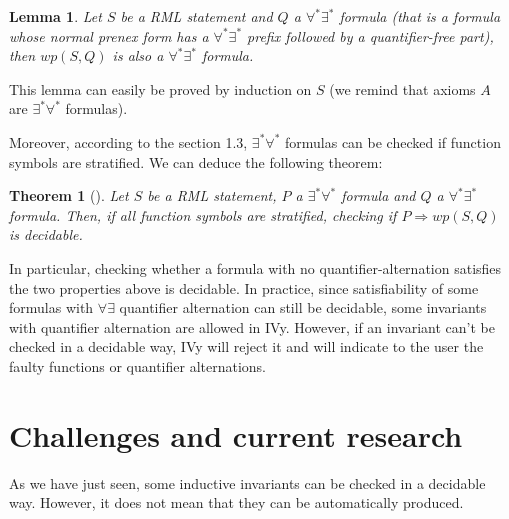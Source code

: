 \documentclass[11pt,a4paper,oldfontcommands,openany]{memoir}
\newtheorem*{theorem}{Theorem}
\newtheorem*{lemma}{Lemma}
\begin{document}
    \begin{lemma}
        Let \(S\) be a RML statement and \(Q\) a \(\forall^*\exists^*\) formula (that is a formula whose normal prenex form has a \(\forall^*\exists^*\) prefix followed by a quantifier-free part), then \(wp(S,Q)\) is also a \(\forall^*\exists^*\) formula.
    \end{lemma}

    This lemma can easily be proved by induction on \(S\) (we remind that axioms \(A\) are \(\exists^*\forall^*\) formulas).
    
    Moreover, according to the section 1.3, \(\exists^*\forall^*\) formulas can be checked if function symbols are stratified.
    We can deduce the following theorem:

    \begin{theorem}[]
        Let \(S\) be a RML statement, \(P\) a \(\exists^*\forall^*\) formula and \(Q\) a \(\forall^*\exists^*\) formula.
        Then, if all function symbols are stratified, checking if \( P \Rightarrow wp(S,Q) \) is decidable.
    \end{theorem}

    In particular, checking whether a formula with no quantifier-alternation satisfies the two properties above is decidable.
    In practice, since satisfiability of some formulas with \( \forall\exists \) quantifier alternation can still be decidable,
    some invariants with quantifier alternation are allowed in IVy. However, if an invariant can't be checked in a decidable way, IVy will reject it
    and will indicate to the user the faulty functions or quantifier alternations.

    \section{Challenges and current research}

    As we have just seen, some inductive invariants can be checked in a decidable way.
    However, it does not mean that they can be automatically produced.
\end{document}
